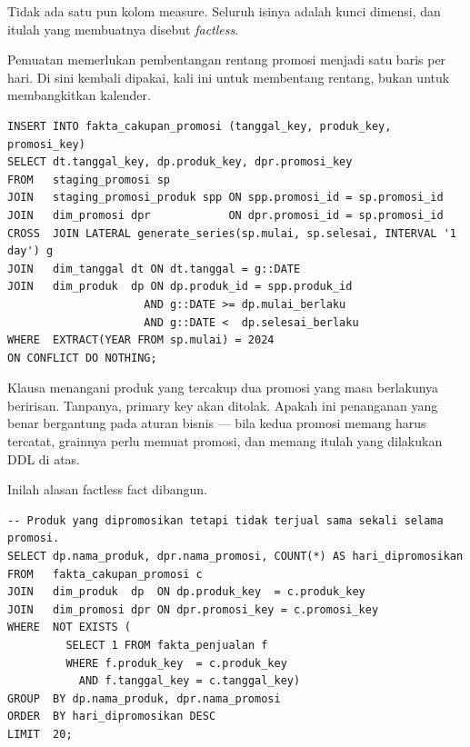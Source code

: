 Tidak ada satu pun kolom measure. Seluruh isinya adalah kunci dimensi, dan
itulah yang membuatnya disebut \emph{factless}.


Pemuatan memerlukan pembentangan rentang promosi menjadi satu baris per hari.
Di sini  kembali dipakai, kali ini untuk membentang
rentang, bukan untuk membangkitkan kalender.

\begin{lstlisting}[style=sqlgaya]
INSERT INTO fakta_cakupan_promosi (tanggal_key, produk_key, promosi_key)
SELECT dt.tanggal_key, dp.produk_key, dpr.promosi_key
FROM   staging_promosi sp
JOIN   staging_promosi_produk spp ON spp.promosi_id = sp.promosi_id
JOIN   dim_promosi dpr            ON dpr.promosi_id = sp.promosi_id
CROSS  JOIN LATERAL generate_series(sp.mulai, sp.selesai, INTERVAL '1 day') g
JOIN   dim_tanggal dt ON dt.tanggal = g::DATE
JOIN   dim_produk  dp ON dp.produk_id = spp.produk_id
                     AND g::DATE >= dp.mulai_berlaku
                     AND g::DATE <  dp.selesai_berlaku
WHERE  EXTRACT(YEAR FROM sp.mulai) = 2024
ON CONFLICT DO NOTHING;
\end{lstlisting}

\begin{catatan}
Klausa  menangani produk yang tercakup dua
promosi yang masa berlakunya beririsan. Tanpanya, primary key akan ditolak.
Apakah ini penanganan yang benar bergantung pada aturan bisnis --- bila kedua
promosi memang harus tercatat, grainnya perlu memuat promosi, dan memang itulah
yang dilakukan DDL di atas.
\end{catatan}


Inilah alasan factless fact dibangun.

\begin{lstlisting}[style=sqlgaya]
-- Produk yang dipromosikan tetapi tidak terjual sama sekali selama promosi.
SELECT dp.nama_produk, dpr.nama_promosi, COUNT(*) AS hari_dipromosikan
FROM   fakta_cakupan_promosi c
JOIN   dim_produk  dp  ON dp.produk_key  = c.produk_key
JOIN   dim_promosi dpr ON dpr.promosi_key = c.promosi_key
WHERE  NOT EXISTS (
         SELECT 1 FROM fakta_penjualan f
         WHERE f.produk_key  = c.produk_key
           AND f.tanggal_key = c.tanggal_key)
GROUP  BY dp.nama_produk, dpr.nama_promosi
ORDER  BY hari_dipromosikan DESC
LIMIT  20;
\end{lstlisting}

